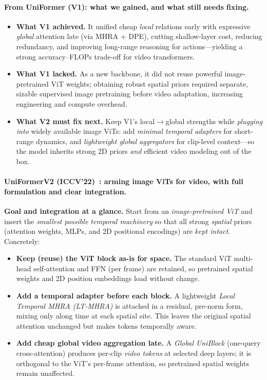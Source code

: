 \begin{enrichment}
\begin{enrichment}
        \paragraph{From UniFormer (V1): what we gained, and what still needs fixing.}
        \begin{itemize}
            \item \textbf{What V1 achieved.} It unified cheap \emph{local} relations early with expressive \emph{global} attention late (via MHRA + DPE), cutting shallow-layer cost, reducing redundancy, and improving long-range reasoning for actions—yielding a strong accuracy–FLOPs trade-off for video transformers. 
            \item \textbf{What V1 lacked.} As a new backbone, it did not reuse powerful image-pretrained ViT weights; obtaining robust spatial priors required separate, sizable supervised image pretraining before video adaptation, increasing engineering and compute overhead. 
            \item \textbf{What V2 must fix next.} Keep V1’s local\(\rightarrow\)global strengths while \emph{plugging into} widely available image ViTs: add \emph{minimal temporal adapters} for short-range dynamics, and \emph{lightweight global aggregators} for clip-level context—so the model inherits strong 2D priors \emph{and} efficient video modeling out of the box. 
        \end{itemize}
        
        \paragraph{UniFormerV2 (ICCV’22)~\cite{li2022_uniformerv2}: arming image ViTs for video, with full formulation and clear integration.}
        \textbf{Goal and integration at a glance.} Start from an \emph{image-pretrained ViT} and insert the \emph{smallest possible temporal machinery} so that all strong \emph{spatial} priors (attention weights, MLPs, and 2D positional encodings) are \emph{kept intact}. Concretely:
        \begin{itemize}
            \item \textbf{Keep (reuse) the ViT block as-is for space.} The standard ViT multi-head self-attention and FFN (per frame) are retained, so pretrained spatial weights and 2D position embeddings load without change. 
            \item \textbf{Add a temporal adapter before each block.} A lightweight \emph{Local Temporal MHRA (LT-MHRA)} is attached in a residual, pre-norm form, mixing only along time at each spatial site. This leaves the original spatial attention unchanged but makes tokens temporally aware. 
            \item \textbf{Add cheap global video aggregation late.} A \emph{Global UniBlock} (one-query cross-attention) produces per-clip \emph{video tokens} at selected deep layers; it is orthogonal to the ViT’s per-frame attention, so pretrained spatial weights remain unaffected. 
        \end{itemize}
        

\end{enrichment}
\end{enrichment}
